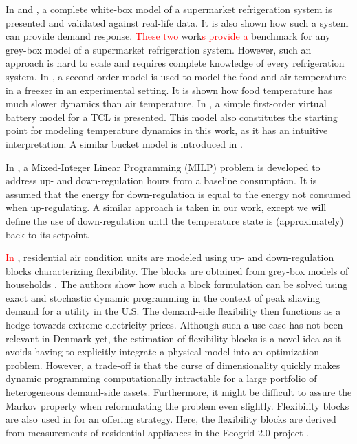 \documentclass[11pt,a4paper]{article}
\begin{document}
In \cite{petersen2012eso2} and \cite{pedersen2013direct}, a complete white-box model of a supermarket refrigeration system is presented and validated against real-life data. It is also shown how such a system can provide demand response. \textcolor{red}{These two} work\textcolor{red}{s} \textcolor{red}{provide a} benchmark for any grey-box model of a supermarket refrigeration system. However, such an approach is hard to scale and requires complete knowledge of every refrigeration system. In \cite{pedersen2016improving}, a second-order model is used to model the food and air temperature in a freezer in an experimental setting. It is shown how food temperature has much slower dynamics than air temperature. In \cite{hao2014aggregate}, a simple first-order virtual battery model for a TCL is presented. This model also constitutes the starting point for modeling temperature dynamics in this work, as it has an intuitive interpretation. A similar bucket model is introduced in \cite{petersen2013taxonomy}.

In \cite{de2019leveraging}, a Mixed-Integer Linear Programming (MILP) problem  is developed to  address up- and down-regulation hours from a baseline consumption. It is assumed that the energy for down-regulation is equal to the energy not consumed when up-regulating. A similar approach is taken in our work, except we will define the use of down-regulation until the temperature state is (approximately) back to its setpoint.

\textcolor{red}{In \cite{schaperow2019simulation,chanpiwat2020using, moglen2020optimal}}, residential air condition units are modeled using up- and down-regulation blocks characterizing flexibility. The blocks are obtained from grey-box models of households \cite{siemann2013performance}. The authors show how such a block formulation can be solved using exact and stochastic dynamic programming in the context of peak shaving demand for a utility in the U.S. The demand-side flexibility then functions as a hedge towards extreme electricity prices. Although such a use case has not been relevant in Denmark yet, the estimation of flexibility blocks is a novel idea as it avoids having to explicitly integrate a physical model into an optimization problem. However, a trade-off is that the curse of dimensionality quickly makes dynamic programming computationally intractable for a large portfolio of heterogeneous demand-side assets. Furthermore, it might be difficult to assure the Markov property \cite{MarkovProperty} when reformulating the problem even slightly. Flexibility blocks are also used in \cite{bobo2018offering} for an offering strategy. Here, the flexibility blocks are derived from measurements of residential appliances in the Ecogrid 2.0 project \cite{ecogrid}.
\end{document}
